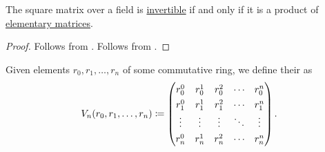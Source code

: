 \begin{proposition}\label{thm:product_of_elementary_matrices_iff_invertible}
  The square matrix over a field is \hyperref[def:inverse_matrix]{invertible} if and only if it is a product of \hyperref[def:elementary_matrix]{elementary matrices}.
\end{proposition}
\begin{proof}
  \SufficiencySubProof Follows from .
  \NecessitySubProof Follows from .
\end{proof}

\begin{example}\label{ex:vandermonde_matrix}
  Given elements \( r_0, r_1, \ldots, r_n \) of some commutative ring, we define their  as
  \begin{equation*}
    \RenewDocumentCommand \arraystretch {} {1.3}
    V_n(r_0, r_1, \ldots, r_n)
    \coloneqq
    \begin{pmatrix}
      r_0^0  & r_0^1  & r_0^2  & \cdots & r_0^n  \\
      r_1^0  & r_1^1  & r_1^2  & \cdots & r_1^n  \\
      \vdots & \vdots & \vdots & \ddots & \vdots \\
      r_n^0  & r_n^1  & r_n^2  & \cdots & r_n^n
    \end{pmatrix}.
  \end{equation*}


\end{example}
